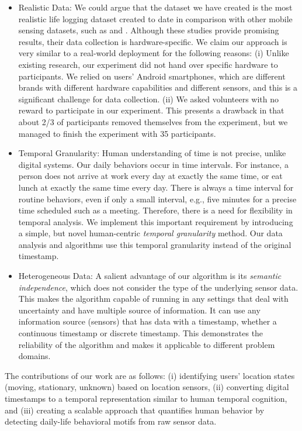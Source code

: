 \documentclass{sig-alternate}
\begin{document}
\begin{itemize}\itemsep1pt \parskip0pt 
\item{Realistic Data: We could argue that the dataset we have created is the most realistic life logging dataset created to date in comparison with other mobile sensing datasets, such as \cite{realitymining} and \cite{lausane}. Although these studies provide promising results, their data collection is hardware-specific. We claim our approach is very similar to a real-world deployment for the following reasons: (i) Unlike existing research, our experiment did not hand over specific hardware to participants. We relied on users' Android smartphones, which are different brands with different hardware capabilities and different sensors, and this is a significant challenge for data collection. (ii) We asked volunteers with no reward to participate in our experiment. This presents a drawback in that about 2/3 of participants removed themselves from the experiment, but we managed to finish the experiment with 35 participants.}
\item{Temporal Granularity: Human understanding of time is not precise, unlike digital systems. Our daily behaviors occur in time intervals. For instance, a person does not arrive at work every day at exactly the same time, or eat lunch at exactly the same time every day. There is always a time interval for routine behaviors, even if only a small interval, e.g., five minutes for a precise time scheduled such as a meeting. Therefore, there is a need for flexibility in temporal analysis. We implement this important requirement by introducing a simple, but novel human-centric \emph{temporal granularity} method. Our data analysis and algorithms use this temporal granularity instead of the original timestamp.} 
\item{Heterogeneous Data: A salient advantage of our algorithm is its \emph{semantic independence}, which does not consider the type of the underlying sensor data. This makes the algorithm capable of running in any settings that deal with uncertainty and have multiple source of information. It can use any information source (sensors) that has data with a timestamp, whether a continuous timestamp or discrete timestamp. This demonstrates the reliability of the algorithm and makes it applicable to different problem domains.}
\end{itemize}
\vspace{-0.1cm}
The contributions of our work are as follows: (i) identifying users' location states (moving, stationary, unknown) based on location sensors, (ii) converting digital timestamps to a temporal representation similar to human temporal cognition, and (iii) creating a scalable approach that quantifies human behavior by detecting daily-life behavioral motifs from raw sensor data.  \\
\end{document}
